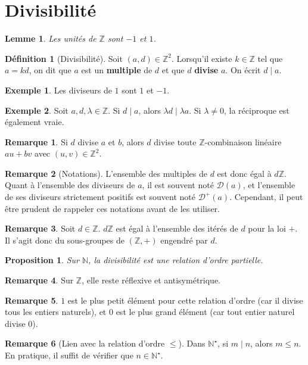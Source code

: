 \documentclass[french]{book}
\newcommand{\N}{\mathbb{N}}
\newcommand{\Z}{\mathbb{Z}}
\newcommand{\st}{^\star}
\theoremstyle{plain}
\newtheorem{lem}{Lemme}[chapter]
\newtheorem{prop}{Proposition}[chapter]
\theoremstyle{definition}
\newtheorem{dfn}{Définition}[chapter]
\newtheorem{exa}{Exemple}[chapter]
\newtheorem{rmq}{Remarque}[chapter]
\theoremstyle{remark}
\begin{document}
\section{Divisibilité}
\begin{lem}
	Les unités de $\Z$ sont $-1$ et $1$.
\end{lem}
\begin{dfn}[Divisibilité]
	Soit $(a,d)\in\Z^2$. Lorsqu'il existe $k\in\Z$ tel que $a=kd$, on dit que $a$ est un \textbf{multiple} de $d$ et que $d$ \textbf{divise} $a$. On écrit $d\mid a$.
\end{dfn}
\begin{exa}
	Les diviseurs de $1$ sont $1$ et $-1$.
\end{exa}
\begin{exa}
	Soit $a,d,\lambda\in\Z$. Si $d\mid a$, alors $\lambda d\mid\lambda a$. Si $\lambda\ne0$, la réciproque est également vraie.
\end{exa}
\begin{rmq}
	Si $d$ divise $a$ et $b$, alors $d$ divise toute $\Z$-combinaison linéaire $au+bv$ avec $(u,v)\in\Z^2$.
\end{rmq}
\begin{rmq}[Notations]
	L'ensemble des multiples de $d$ est donc égal à $d\Z$. Quant à l'ensemble des diviseurs de $a$, il est souvent noté $\mathcal{D}(a)$, et l'ensemble de ses diviseurs strictement positifs est souvent noté $\mathcal{D}^+(a)$. Cependant, il peut être prudent de rappeler ces notations avant de les utiliser.
\end{rmq}
\begin{rmq}
	Soit $d\in\Z$. $d\Z$ est égal à l'ensemble des itérés de $d$ pour la loi $+$. Il s'agit donc du sous-groupes de $(\Z,+)$ engendré par $d$.
\end{rmq}
\begin{prop}
	Sur $\N$, la divisibilité est une relation d'ordre partielle.
\end{prop}
\begin{rmq}
	Sur $\Z$, elle reste réflexive et antisymétrique.
\end{rmq}
\begin{rmq}
	$1$ est le plus petit élément pour cette relation d'ordre (car il divise tous les entiers naturels), et $0$ est le plus grand élément (car tout entier naturel divise $0$).
\end{rmq}
\begin{rmq}[Lien avec la relation d'ordre $\leqslant$]
	Dans $\N\st$, si $m\mid n$, alors $m\leqslant n$. En pratique, il suffit de vérifier que $n\in\N\st$.
\end{rmq}
\end{document}
